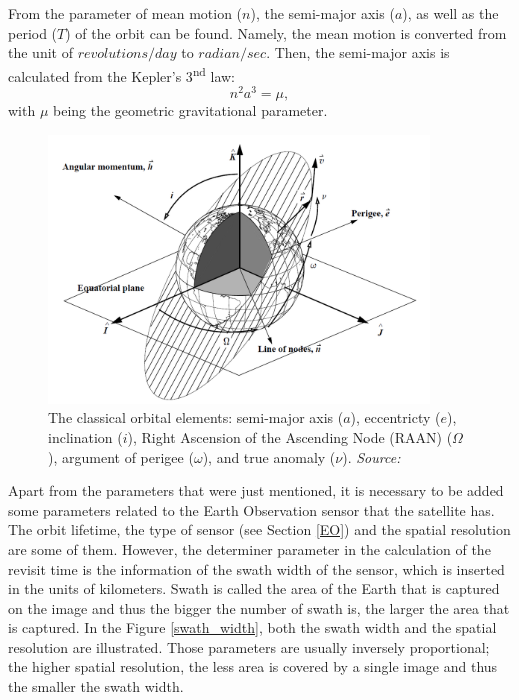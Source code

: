 From the parameter of mean motion ($n$), the semi-major axis ($a$), as well as the period ($T$) of the orbit can be found. Namely, the mean motion is converted from the unit of $revolutions/day$ to $radian/sec$. Then, the semi-major axis is calculated from the Kepler's 3\textsuperscript{nd} law:
\begin{equation}
\label{3rd_keplers_law}
n^2 a^3 = \mu,
\end{equation}
with $\mu$ being the geometric gravitational parameter.

\begin{figure}
\centering
\includegraphics[width=0.9\textwidth]{Images/keplerian_elements.png}\caption{The classical orbital elements: semi-major axis ($a$), eccentricty ($e$), inclination ($i$), Right Ascension of the Ascending Node (RAAN) ($\Omega$), argument of perigee ($\omega$), and true anomaly ($\nu$). \textit{Source: \cite{Vallado}}}
\label{keplerian_elements} 
\end{figure}

Apart from the parameters that were just mentioned, it is necessary to be added some parameters related to the Earth Observation sensor that the satellite has. The orbit lifetime, the type of sensor (see Section \ref{EO}) and the spatial resolution are some of them. However, the determiner parameter in the calculation of the revisit time is the information of the swath width of the sensor, which is inserted in the units of kilometers. Swath is called the area of the Earth that is captured on the image and thus the bigger the number of swath is, the larger the area that is captured. In the Figure \ref{swath_width}, both the swath width and the spatial resolution are illustrated. Those parameters are usually inversely proportional; the higher spatial resolution, the less area is covered by a single image and thus the smaller the swath width.


